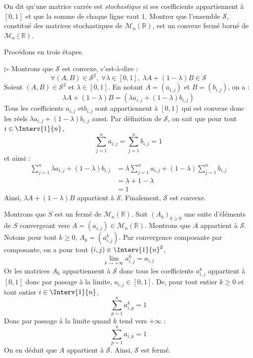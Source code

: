 \documentclass[a4paper,10pt]{report}
\begin{document}
\begin{Exa} On dit qu'une matrice carrée est \textit{stochastique} si ses coefficients appartiennent à $[0,1]$ et que la somme de chaque ligne vaut $1$. Montrer que l'ensemble $\mathcal{S}$, constitué des matrices stochastiques de $\mathcal{M}_n(\mathbb{R})$, est un convexe fermé borné de $\mathcal{M}_n(\mathbb{R})$.
\end{Exa} 

\corr Procédons en trois étapes.

\medskip

\noindent $\rhd$ Montrons que $\mathcal{S}$ est convexe, c'est-à-dire :
$$ \forall (A,B) \in \mathcal{S}^2, \; \forall \lambda \in [0,1], \; \lambda A+(1-\lambda)B \in \mathcal{S}$$
Soient $(A,B) \in \mathcal{S}^2$ et $\lambda \in [0,1]$. En notant $A=(a_{i,j})$ et $B=(b_{i,j})$, on a :
$$ \lambda A+ (1- \lambda) B = (\lambda a_{i,j} + (1- \lambda) b_{i,j})$$
Tous les coefficients $a_{i,j}$ et$ b_{i,j}$ sont appartiennent à $[0,1]$ qui est convexe donc les réels $\lambda a_{i,j} + (1- \lambda) b_{i,j}$ aussi. Par définition de $\mathcal{S}$, on sait que pour tout $i \in \Interv{1}{n}$,
$$ \sum_{j=1}^n a_{i,j} = \sum_{j=1}^n b_{i,j} = 1$$
et ainsi :
\begin{align*}
\sum_{j=1}^n \lambda a_{i,j} + (1 - \lambda) b_{i,j} & = \lambda   \sum_{j=1}^n a_{i,j} + (1 - \lambda)  \sum_{j=1}^n b_{i,j}  \\
& = \lambda + 1- \lambda \\
& = 1
\end{align*}
Ainsi, $\lambda A+ (1- \lambda)B$ appartient à $\mathcal{S}$. Finalement, $\mathcal{S}$ est convexe.

\medskip

\noindent Montrons que $S$ est un fermé de $\mathcal{M}_n(\mathbb{R})$. Soit $(A_k)_{k \geq 0}$ une suite d'éléments de $S$ convergeant vers $A=(a_{i,j}) \in \mathcal{M}_n(\mathbb{R})$. Montrons que $A$ appartient à $\mathcal{S}$. Notons pour tout $k \geq 0$, $A_k = (a_{i,j}^k)$. Par convergence composante par composante, on a pour tout $(i,j) \in \Interv{1}{n}^2$,
$$ \lim_{k \rightarrow + \infty} a_{i,j}^k = a_{i,j}$$
Or les matrices $A_k$ appartiennent à $\mathcal{S}$ donc tous les coefficients $a_{i,j}^k$ appartient à $[0,1]$ donc par passage à la limite, $a_{i,j} \in [0,1]$. De, pour tout entier $k \geq 0$ et tout entier $i \in \Interv{1}{n}$,
$$ \sum_{p=1}^n a_{i,p}^k = 1$$
Donc par passage à la limite quand $k$ tend vers $+ \infty$ :
$$ \sum_{p=1}^n a_{i,p} = 1$$
On en déduit que $A$ appartient à $\mathcal{S}$. Ainsi, $\mathcal{S}$ est fermé.
\end{document}
